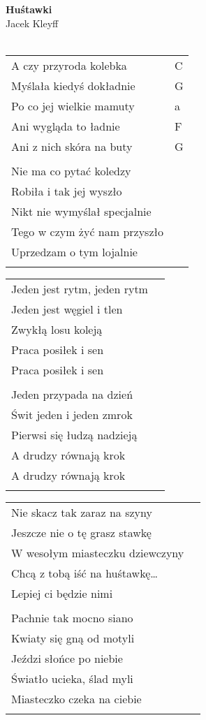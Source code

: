 \documentclass[a5paper]{article}
\begin{document}


\noindent
\fontsize{12pt}{15pt}\selectfont
\textbf{Huśtawki} \\
\fontsize{8pt}{10pt}\selectfont
Jacek Kleyff \\ \\
\fontsize{10pt}{12pt}\selectfont
{}
\begin{tabular}{@{}p{7.50cm}p{3cm}@{}}
\noindent
A czy przyroda kolebka & C \\
Myślała kiedyś dokładnie & G \\
Po co jej wielkie mamuty & a \\
Ani wygląda to ładnie & F \\
Ani z nich skóra na buty & G \\ \\

Nie ma co pytać koledzy	\\
Robiła i tak jej wyszło	 \\
Nikt nie wymyślał specjalnie \\
Tego w czym żyć nam przyszło \\	 
Uprzedzam o tym lojalnie \\ \\
\end{tabular}

\noindent
\begin{tabular}{@{}p{6.50cm}p{3cm}@{}}
	Jeden jest rytm, jeden rytm	\\
	Jeden jest węgiel i tlen \\
	Zwykłą losu koleją	 \\
	Praca posiłek i sen	 \\
	Praca posiłek i sen	 \\ \\

	Jeden przypada na dzień	 \\
	Świt jeden i jeden zmrok \\	 
	Pierwsi się łudzą nadzieją	 \\
	A drudzy równają krok	 \\
	A drudzy równają krok	 \\ \\
\end{tabular}

\noindent
\begin{tabular}{@{}p{6.50cm}p{3cm}@{}}
Nie skacz tak zaraz na szyny	 \\
Jeszcze nie o tę grasz stawkę	 \\
W wesołym miasteczku dziewczyny	 \\
Chcą z tobą iść na huśtawkę… \\
Lepiej ci będzie nimi	 \\ \\

Pachnie tak mocno siano	 \\
Kwiaty się gną od motyli\\	 
Jeździ słońce po niebie	 \\
Światło ucieka, ślad myli\\	 
Miasteczko czeka na ciebie\\ \\	 
\end{tabular}
\end{document}
